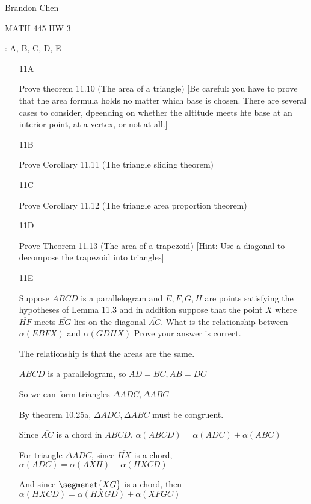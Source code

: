 \documentclass[11pt]{article}
\newcommand{\segment}[1]{\overline{#1}}
\begin{document}
\noindent Brandon Chen

\noindent MATH 445 HW 3

: A, B, C, D, E

\begin{itemize}

	\item[11A]
		
		Prove theorem 11.10 (The area of a triangle) [Be careful: you have to prove that the area formula holds no matter which base is chosen. There are several cases to consider, dpeending on whether the altitude meets hte base at an interior point, at a vertex, or not at all.]

	\item[11B]

		Prove Corollary 11.11 (The triangle sliding theorem)

	\item[11C]

		Prove Corollary 11.12 (The triangle area proportion theorem)

	\item[11D]

		Prove Theorem 11.13 (The area of a trapezoid) [Hint: Use a diagonal to decompose the trapezoid into triangles]



	\item[11E]

		Suppose $ABCD$ is a parallelogram and $E,F,G,H$ are points satisfying the hypotheses of Lemma 11.3 and in addition suppose that the point $X$ where $\segment{HF}$ meets $\segment{EG}$ lies on the diagonal $\segment{AC}$. What is the relationship between $\alpha(EBFX)$ and $\alpha(GDHX)$ Prove your answer is correct.

		The relationship is that the areas are the same.

		$ABCD$ is a parallelogram, so $AD = BC, AB = DC$

		So we can form triangles $\Delta ADC, \Delta ABC$

		By theorem 10.25a, $\Delta ADC, \Delta ABC$ must be congruent.

		Since $\segment{AC}$ is a chord in $ABCD$, $\alpha(ABCD) = \alpha(ADC) + \alpha(ABC)$

		For triangle $\Delta ADC$, since $\segment{HX}$ is a chord, $\alpha(ADC) = \alpha(AXH) + \alpha(HXCD)$

		And since $\segmenet{XG}$ is a chord, then $\alpha(HXCD) = \alpha(HXGD) + \alpha(XFGC)$


\end{itemize}
\end{document}
